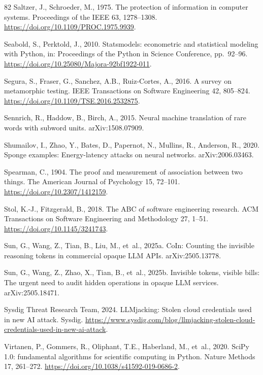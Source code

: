 \documentclass[preprint,3p,authoryear,12pt]{elsarticle}
\begin{document}
\begin{thebibliography}{82}
Saltzer, J., Schroeder, M., 1975. The protection of information in computer systems. Proceedings of the IEEE 63, 1278--1308. \url{https://doi.org/10.1109/PROC.1975.9939}.

Seabold, S., Perktold, J., 2010. Statsmodels: econometric and statistical modeling with Python, in: Proceedings of the Python in Science Conference, pp.~92--96. \url{https://doi.org/10.25080/Majora-92bf1922-011}.

Segura, S., Fraser, G., Sanchez, A.B., Ruiz-Cortes, A., 2016. A survey on metamorphic testing. IEEE Transactions on Software Engineering 42, 805--824. \url{https://doi.org/10.1109/TSE.2016.2532875}.

Sennrich, R., Haddow, B., Birch, A., 2015. Neural machine translation of rare words
with subword units. arXiv:1508.07909.

Shumailov, I., Zhao, Y., Bates, D., Papernot, N., Mullins, R., Anderson, R., 2020.
Sponge examples: Energy-latency attacks on neural networks. arXiv:2006.03463.

Spearman, C., 1904. The proof and measurement of association between two things. The American Journal of Psychology 15, 72--101. \url{https://doi.org/10.2307/1412159}.

Stol, K.-J., Fitzgerald, B., 2018. The ABC of software engineering research. ACM Transactions on Software Engineering and Methodology 27, 1--51. \url{https://doi.org/10.1145/3241743}.

Sun, G., Wang, Z., Tian, B., Liu, M., et~al., 2025a. CoIn: Counting the invisible
reasoning tokens in commercial opaque LLM APIs. arXiv:2505.13778.

Sun, G., Wang, Z., Zhao, X., Tian, B., et~al., 2025b. Invisible tokens, visible bills:
The urgent need to audit hidden operations in opaque LLM services. arXiv:2505.18471.

Sysdig Threat Research Team, 2024. LLMjacking: Stolen cloud credentials used in new AI
attack. Sysdig.
\url{https://www.sysdig.com/blog/llmjacking-stolen-cloud-credentials-used-in-new-ai-attack}.

Virtanen, P., Gommers, R., Oliphant, T.E., Haberland, M., et~al., 2020. SciPy 1.0: fundamental algorithms for scientific computing in Python. Nature Methods 17, 261--272. \url{https://doi.org/10.1038/s41592-019-0686-2}.


\end{thebibliography}
\end{document}
